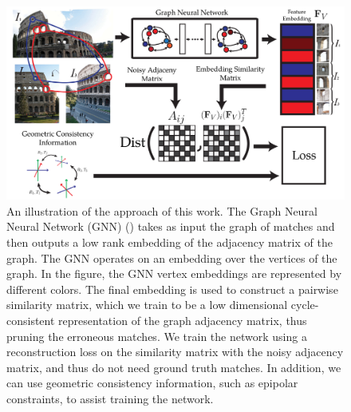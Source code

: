 \documentclass{article} %
\begin{document}

\begin{figure}[t]
\begin{center}
  \includegraphics[width=0.8\linewidth]{figures-CycleConsistencyMainFigure-v4.pdf}
\end{center}
  \caption{
    An illustration of the approach of this work.
    The Graph Neural Neural Network (GNN) (\cite{battaglia2018relational}) takes as input the graph of matches and then outputs a low rank embedding of the adjacency matrix of the graph.
    The GNN operates on an embedding over the vertices of the graph.
    In the figure, the GNN vertex embeddings are represented by different colors.
    The final embedding is used to construct a pairwise similarity matrix, which we train to be a low dimensional cycle-consistent representation of the graph adjacency matrix, thus pruning the erroneous matches.
    We train the network using a reconstruction loss on the similarity matrix with the noisy adjacency matrix, and thus do not need ground truth matches.
    In addition, we can use geometric consistency information, such as epipolar constraints, to assist training the network.
  }
\label{fig:pipeline}
\end{figure}
\end{document}
